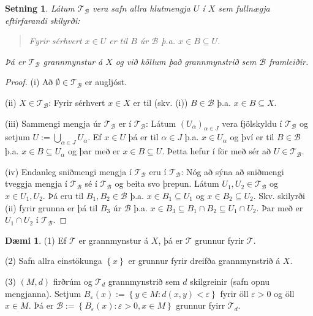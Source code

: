 \documentclass[a4paper,icelandic]{book}
\theoremstyle{definition}
\newtheorem{daemi}{Dæmi}[section]
\theoremstyle{plain}
\newtheorem{setn}{Setning}[section]
\theoremstyle{remark}
\begin{document}
\begin{setn}
  Látum $\mathcal T_{\mathcal B}$ vera safn allra hlutmengja $U$ í $X$ sem
  fullnægja eftirfarandi skilyrði:
  \begin{quote}
    Fyrir sérhvert $x\in U$ er til $B$ úr $\mathcal B$ þ.a. $x\in B\subseteq U$.
  \end{quote}
  Þá er $\mathcal T_{\mathcal B}$ grannmynstur á $X$ og við köllum það
  \emph{grannmynstrið sem $\mathcal B$ framleiðir}.
\end{setn}
\begin{proof}
  (i) Að $\emptyset \in \mathcal T_{\mathcal B}$ er augljóst.

  (ii) $X\in\mathcal T_{\mathcal B}$: Fyrir sérhvert $x \in X$ er til (skv. (i))
  $B\in\mathcal B$ þ.a. $x\in B\subseteq X$.

  (iii) Sammengi mengja úr $\mathcal T_{\mathcal B}$ er í $\mathcal T_{\mathcal
    B}$: Látum $(U_\alpha)_{\alpha\in J}$ vera fjölskyldu í $\mathcal
  T_{\mathcal B}$ og setjum $U:=\bigcup_{\alpha\in J}U_\alpha$. Ef $x\in U$ þá
  er til $\alpha \in J$ þ.a. $x\in U_{\alpha}$ og því er til $B\in\mathcal B$
  þ.a. $x\in B\subseteq U_\alpha$ og þar með er $x\in B\subseteq U$. Þetta hefur
  í för með sér að $U\in\mathcal T_{\mathcal B}$.

  (iv) Endanleg sniðmengi mengja í $\mathcal T_{\mathcal B}$ eru í $\mathcal
  T_{\mathcal B}$: Nóg að sýna að sniðmengi tveggja mengja í $\mathcal
  T_{\mathcal B}$ sé í $\mathcal T_{\mathcal B}$ og beita svo þrepun. Látum
  $U_1,U_2\in\mathcal T_{\mathcal B}$ og $x\in U_1,U_2$. Þá eru til
  $B_1,B_2\in\mathcal B$ þ.a. $x\in B_1\subseteq U_1$ og $x\in B_2\subseteq
  U_2$. Skv. skilyrði (ii) fyrir grunna er þá til $B_3$ úr $\mathcal B$
  þ.a. $x\in B_3\subseteq B_1\cap B_2\subseteq U_1\cap U_2$. Þar með er $U_1\cap
  U_2$ í $\mathcal T_{\mathcal B}$.
\end{proof}
\begin{daemi}
  (1) Ef $\mathcal T$ er grannmynstur á $X$, þá er $\mathcal T$ grunnur fyrir
  $\mathcal T$.

  (2) Safn allra einstökunga $\left\{ x \right\}$ er grunnur fyrir dreifða
  grannmynstrið á $X$.

  (3) $(M,d)$ firðrúm og $\mathcal T_{d}$ grannmynstrið sem $d$ skilgreinir
  (safn opnu mengjanna). Setjum $B_{\varepsilon}(x) := \left\{ y\in M : d(x,y) <
    \varepsilon \right\}$ fyrir öll $\varepsilon > 0$ og öll $x\in M$. Þá er
  $\mathcal B := \left\{ B_{\varepsilon}(x) : \varepsilon > 0, x\in M \right\}$
  grunnur fyirr $\mathcal T_{d}$.
\end{daemi}
\end{document}
